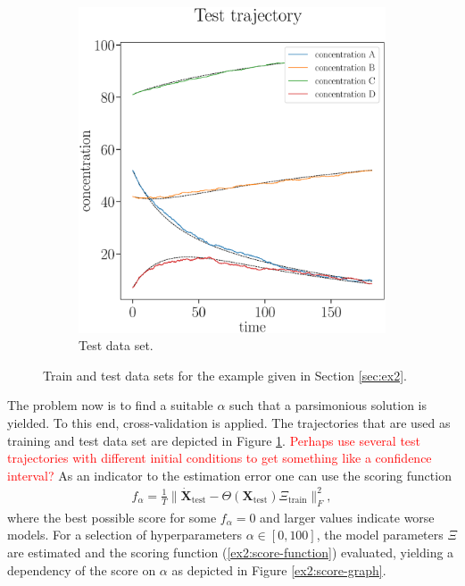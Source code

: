 \documentclass[oneside, abstracton, titlepage]{scrartcl}
\begin{document}
\begin{figure}
\begin{subfigure}[b]{.45\textwidth}
			\includegraphics[width=\textwidth]{./figures_tex/cv_concentrations_test}
			\caption{Test data set.}
		\end{subfigure}
		\caption{Train and test data sets for the example given in Section \ref{sec:ex2}.}
		\label{ex2:test-train-concentration-curves}
	\end{figure}
	
	The problem now is to find a suitable $\alpha$ such that a parsimonious solution is yielded. To this end, cross-validation is applied. The trajectories that are used as training and test data set are depicted in Figure \ref{ex2:test-train-concentration-curves}. \textcolor{red}{Perhaps use several test trajectories with different initial conditions to get something like a confidence interval?} As an indicator to the estimation error one can use the scoring function
	\begin{align}
		f_\alpha = \frac{1}{T}\|\mathbf{\dot{X}}_\text{test} - \Theta (\textbf{X}_\text{test}) \Xi_\text{train}\|_F^2,
		\label{ex2:score-function}
	\end{align}
	where the best possible score for some $f_\alpha = 0$ and larger values indicate worse models.
	For a selection of hyperparameters $\alpha\in [0, 100]$, the model parameters $\Xi$ are estimated and the scoring function (\ref{ex2:score-function}) evaluated, yielding a dependency of the score on $\alpha$ as depicted in Figure \ref{ex2:score-graph}.
	
\end{document}
